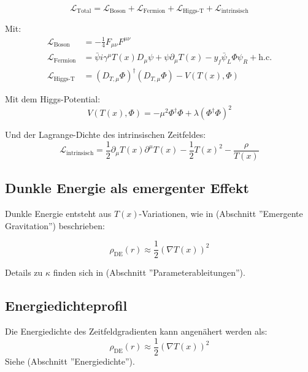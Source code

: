 \documentclass[a4paper,12pt]{article}
\theoremstyle{definition}
\theoremstyle{remark}
\newcommand{\Tfield}{T(x)}
\newcommand{\DcovT}[1]{\Tfield D_\mu #1 + #1 \partial_\mu \Tfield}
\begin{document}
	\begin{equation}
		\mathcal{L}_{\text{Total}} = \mathcal{L}_{\text{Boson}} + \mathcal{L}_{\text{Fermion}} + \mathcal{L}_{\text{Higgs-T}} + \mathcal{L}_{\text{intrinsisch}}
	\end{equation}
	
	Mit:
	\begin{align}
		\mathcal{L}_{\text{Boson}} &= -\frac{1}{4} F_{\mu\nu} F^{\mu\nu} \\
		\mathcal{L}_{\text{Fermion}} &= \bar{\psi} i \gamma^\mu \DcovT{\psi} - y_f \bar{\psi}_L \Phi \psi_R + \text{h.c.} \\
		\mathcal{L}_{\text{Higgs-T}} &= (D_{T,\mu} \Phi)^\dagger (D_{T,\mu} \Phi) - V(\Tfield, \Phi)
	\end{align}
	
	Mit dem Higgs-Potential:
	\begin{equation}
		V(\Tfield, \Phi) = -\mu^2 \Phi^\dagger \Phi + \lambda (\Phi^\dagger \Phi)^2
	\end{equation}
	
	Und der Lagrange-Dichte des intrinsischen Zeitfeldes:
	\begin{equation}
		\mathcal{L}_{\text{intrinsisch}} = \frac{1}{2} \partial_\mu \Tfield \partial^\mu \Tfield - \frac{1}{2}\Tfield^2 - \frac{\rho}{\Tfield}
	\end{equation}
	
	\subsection{Dunkle Energie als emergenter Effekt}
	
	Dunkle Energie entsteht aus \(\Tfield\)-Variationen, wie in \cite{pascher_galaxies_2025} (Abschnitt ''Emergente Gravitation'') beschrieben:
	
	\begin{equation}
		\rho_{\text{DE}}(r) \approx \frac{1}{2} (\nabla \Tfield)^2
	\end{equation}
	
	Details zu \(\kappa\) finden sich in \cite{pascher_params_2025} (Abschnitt ''Parameterableitungen'').
	
	\subsection{Energiedichteprofil}
	
	Die Energiedichte des Zeitfeldgradienten kann angenähert werden als:
	\begin{equation}
		\rho_{\text{DE}}(r) \approx \frac{1}{2} (\nabla \Tfield)^2
	\end{equation}
	Siehe \cite{pascher_galaxies_2025} (Abschnitt ''Energiedichte'').
	
\end{document}
